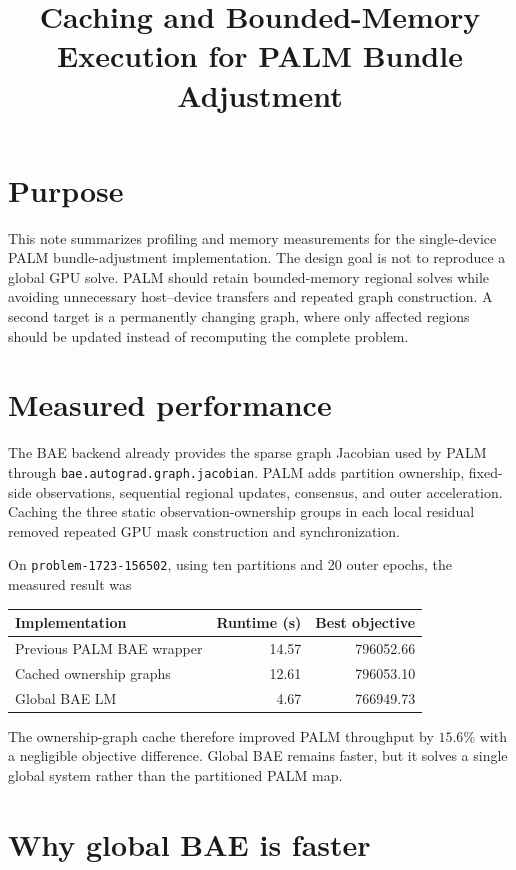 \documentclass[11pt]{article}
\title{Caching and Bounded-Memory Execution for PALM Bundle Adjustment}
\author{}
\date{}
\begin{document}
\maketitle

\section{Purpose}

This note summarizes profiling and memory measurements for the single-device
PALM bundle-adjustment implementation.  The design goal is not to reproduce a
global GPU solve.  PALM should retain bounded-memory regional solves while
avoiding unnecessary host--device transfers and repeated graph construction.
A second target is a permanently changing graph, where only affected regions
should be updated instead of recomputing the complete problem.

\section{Measured performance}

The BAE backend already provides the sparse graph Jacobian used by PALM through
\texttt{bae.autograd.graph.jacobian}.  PALM adds partition ownership, fixed-side
observations, sequential regional updates, consensus, and outer acceleration.
Caching the three static observation-ownership groups in each local residual
removed repeated GPU mask construction and synchronization.

On \texttt{problem-1723-156502}, using ten partitions and 20 outer epochs, the
measured result was
\begin{center}
\begin{tabular}{lrr}
  \toprule
  Implementation & Runtime (s) & Best objective \\
  \midrule
  Previous PALM BAE wrapper & 14.57 & 796052.66 \\
  Cached ownership graphs   & 12.61 & 796053.10 \\
  Global BAE LM             &  4.67 & 766949.73 \\
  \bottomrule
\end{tabular}
\end{center}
The ownership-graph cache therefore improved PALM throughput by $15.6\%$ with
a negligible objective difference.  Global BAE remains faster, but it solves a
single global system rather than the partitioned PALM map.

\section{Why global BAE is faster}
\end{document}
